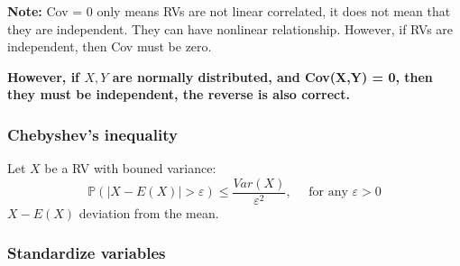 \documentclass[12pt]{article}
\begin{document}
{\textbf {Note:}} Cov = 0 only means RVs are not linear correlated, it does not mean
that they are independent. They can have nonlinear relationship.
However, if RVs are independent, then Cov must be zero.

{\textbf {However, if $ X,Y $ are normally distributed, and Cov(X,Y) = 0, then they
must be independent, the reverse is also correct.}}




\begin{figure}[H]
\end{figure}











\subsubsection{Chebyshev's inequality}
Let $ X $ be a RV with bouned variance:
\begin{equation*}
\mathbb{P}\left( \left\lvert X - E(X) \right\rvert > \varepsilon  \right) \le 
\frac{Var(X)}{\varepsilon^{2}}, \quad \text{ for any } \varepsilon > 0
\end{equation*}
$ X - E(X) $ deviation from the mean.


\subsubsection{Standardize variables}
\end{document}
